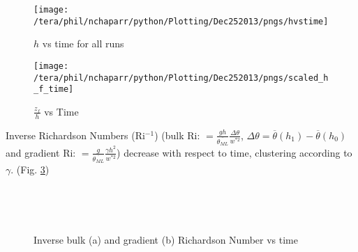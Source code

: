 \begin{figure}[htbp]
    \centering
    \texttt{[image: /tera/phil/nchaparr/python/Plotting/Dec252013/pngs/hvstime]}
    \caption{$h$ vs time for all runs}
    \label{fig:hvstime}   %
\end{figure}


\begin{figure}[htbp]
    \centering
    \texttt{[image: /tera/phil/nchaparr/python/Plotting/Dec252013/pngs/scaled\_h\_f\_time]}
    \caption{$\frac{z_{f}}{h}$ vs Time}
    \label{fig:hvstime}   %
\end{figure}





Inverse Richardson Numbers (\acs{Ri}$^{-1}$) (bulk \acs{Ri}: $=\frac{gh}{\overline{\theta_{ML}}} \frac{\Delta \theta}{w^{*2}}$, $\Delta \theta = \overline{\theta}(h_{1})-\overline{\theta}(h_{0})$ 
and gradient \acs{Ri}: $=\frac{g}{\overline{\theta_{ML}}} \frac{\gamma h^{2} }{w^{*2}}$) decrease with respect to time, 
clustering according to $\gamma$. (Fig. \ref{fig:invristime})\\

\begin{figure}[htbp]

\begin{minipage}[b]{0.5\linewidth}
         
        \\
        \end{minipage}             
\quad
\begin{minipage}[b]{0.5\linewidth}
        \\
       
       \end{minipage}
        \caption{Inverse bulk (a)  and gradient (b) Richardson Number vs time}
        \label{fig:invristime}
\end{figure}

